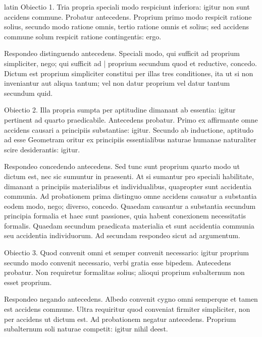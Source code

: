 \begin{otherlanguage*}{latin}
\pstart
  Obiectio 1. Tria propria speciali modo respiciunt inferiora: igitur non sunt accidens commune. Probatur antecedens. Proprium primo modo respicit ratione solius, secundo modo ratione omnis, tertio ratione omnis et solius; sed accidens commune solum respicit ratione contingentis: ergo. 
\pend

\pstart
  Respondeo distinguendo antecedens. Speciali modo, qui sufficit ad proprium simpliciter, nego; qui sufficit ad \textnormal{|}   proprium secundum quod et reductive, concedo. Dictum est proprium simpliciter constitui per illas tres conditiones, ita ut si non inveniantur aut aliqua tantum; vel non datur proprium vel datur tantum secundum quid. 
\pend

\pstart
  Obiectio 2. Illa propria sumpta per aptitudine dimanant ab essentia: igitur pertinent ad quarto praedicabile. Antecedens probatur. Primo ex  affirmante omne accidens causari a principiis substantiae: igitur. Secundo ab inductione, aptitudo ad esse Geometram oritur ex principiis essentialibus naturae humanae naturaliter scire desiderantis: igitur. 
\pend

\pstart
  Respondeo concedendo antecedens. Sed tunc sunt proprium quarto modo ut dictum est, nec sic sumuntur in praesenti. At si sumantur pro speciali habilitate, dimanant a principiis materialibus et individualibus, quapropter sunt accidentia communia. Ad probationem prima distinguo omne accidens causatur a substantia eodem modo, nego; diverso, concedo. Quaedam causantur a substantia secundum principia formalia et haec sunt passiones, quia habent conexionem necessitatis formalis. Quaedam secundum praedicata materialia et sunt accidentia communia seu accidentia individuorum. Ad secundam respondeo sicut ad argumentum. 
\pend

\pstart
  Obiectio 3. Quod convenit omni et semper convenit necessario: igitur proprium secundo modo convenit necessario, verbi gratia esse bipedem. Antecedens probatur. Non requiretur formalitas solius; alioqui proprium subalternum non esset proprium. 
\pend

\pstart
  Respondeo negando antecedens. Albedo convenit cygno omni semperque et tamen est accidens commune. Ultra requiritur quod conveniat firmiter simpliciter, non per accidens ut dictum est. Ad probationem negatur antecedens. Proprium subalternum soli naturae competit: igitur nihil deest. 
\pend


\end{otherlanguage*}
